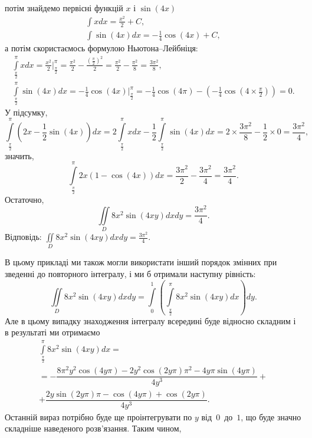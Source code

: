 \begin{example}
\[\]
потім знайдемо первісні функцій $x$ і $\sin\left(4 x\right)$
\[
\begin{array}{c}
\int x d x = \frac{x^2}{2} + C,\\
\int \sin\left(4 x\right) d x = -\frac{1}{4}\cos\left(4 x\right) + C,
\end{array}
\]
а потім скористаємось формулою Ньютона--Лейбніця:
\[
\begin{array}{c}
\int\limits_{\frac{\pi}{2}}^{\pi} x d x = \frac{x^2}{2}\biggr|_\frac{\pi}{2}^\pi = \frac{\pi^2}{2} - \frac{(\frac{\pi}{2})^2}{2} = \frac{\pi^2}{2} - \frac{\pi^2}{8} = \frac{3\pi^2}{8},\\
\int\limits_{\frac{\pi}{2}}^{\pi} \sin\left(4 x\right) d x = -\frac{1}{4}\cos\left(4 x\right)\biggr|_\frac{\pi}{2}^\pi = -\frac{1}{4}\cos\left(4 \pi\right) - \left(-\frac{1}{4}\cos\left(4 \times \frac{\pi}{2}\right)\right) = 0.
\end{array}
\]
У підсумку,
\[
\int\limits_{\frac{\pi}{2}}^{\pi} \left(2 x - \frac{1}{2}\sin\left(4 x\right)\right) d x = 2\int\limits_{\frac{\pi}{2}}^{\pi} x d x - \frac{1}{2} \int\limits_{\frac{\pi}{2}}^{\pi} \sin\left(4 x\right) d x = 2\times \frac{3\pi^2}{8} - \frac{1}{2} \times 0 = \frac{3\pi^2}{4},
\]
значить,
\[
\int\limits_{\frac{\pi}{2}}^{\pi} 2x \left(1 - \cos \left(4 x\right)\right) d x = \frac{3\pi^2}{2} - \frac{3\pi^2}{4} = \frac{3\pi^2}{4}.
\]
Остаточно,
\[
\iint\limits_{D}8 x^2 \sin(4 x y)d x d y = \frac{3\pi^2}{4}.
\]
Відповідь: ${\iint\limits_{D}8 x^2 \sin(4 x y)d x d y = \frac{3\pi^2}{4}.}$
\begin{remark}
В цьому прикладі ми також могли використати інший порядок змінних при зведенні до повторного інтегралу, і ми б отримали наступну рівність:
\[
\iint\limits_{D}8 x^2 \sin(4 x y)d x d y = \int\limits_{0}^{1}\left(\int\limits_{\frac{\pi}{2}}^{\pi}8 x^2 \sin\left(4 x y\right)d x\right)dy.
\]
Але в цьому випадку знаходження інтегралу всередині буде відносно складним і в результаті ми отримаємо
\[
\begin{array}{c}
\int\limits_{\frac{\pi}{2}}^{\pi}8 x^2 \sin\left(4 x y\right)d x = \\= -\dfrac{8 \pi^{2} y^{2} \cos \! \left(4 y \pi \right)-2 y^{2} \cos \! \left(2 y \pi \right) \pi^{2}-4 y \pi  \sin \! \left(4 y \pi \right)}{4 y^{3}}+\\
+\dfrac{2 y \sin \! \left(2 y \pi \right) \pi -\cos \! \left(4 y \pi \right)+\cos \! \left(2 y \pi \right)}{4 y^{3}}.
\end{array}
\]
Останній вираз потрібно буде ще проінтегрувати по $y$ від~$0$~до~$1$, що буде значно складніше наведеного розв'язання. Таким чином,

\end{remark}
\end{example}
